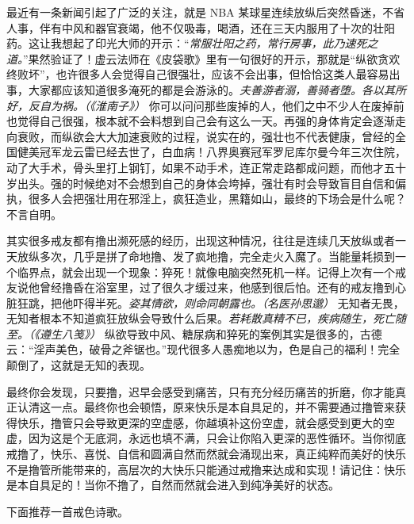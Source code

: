 最近有一条新闻引起了广泛的关注，就是 NBA 某球星连续放纵后突然昏迷，不省人事，伴有中风和器官衰竭，他不仅吸毒，喝酒，还在三天内服用了十次的壮阳药。这让我想起了印光大师的开示：“\textit{常服壮阳之药，常行房事，此乃速死之道。}”果然验证了！虚云法师在《皮袋歌》里有一句很好的开示，那就是“纵欲贪欢终败坏”，也许很多人会觉得自己很强壮，应该不会出事，但恰恰这类人最容易出事，大家都应该知道很多淹死的都是会游泳的。\textit{夫善游者溺，善骑者堕。各以其所好，反自为祸。（《淮南子》）} 你可以问问那些废掉的人，他们之中不少人在废掉前也觉得自己很强，根本就不会料想到自己会有这么一天。再强的身体肯定会逐渐走向衰败，而纵欲会大大加速衰败的过程，说实在的，强壮也不代表健康，曾经的全国健美冠军龙云雷已经去世了，白血病！八界奥赛冠军罗尼库尔曼今年三次住院，动了大手术，骨头里打上钢钉，如果不动手术，连正常走路都成问题，而他才五十岁出头。强的时候绝对不会想到自己的身体会垮掉，强壮有时会导致盲目自信和偏执，很多人会把强壮用在邪淫上，疯狂造业，黑籍如山，最终的下场会是什么呢？不言自明。

其实很多戒友都有撸出濒死感的经历，出现这种情况，往往是连续几天放纵或者一天放纵多次，几乎是拼了命地撸、发了疯地撸，完全走火入魔了。当能量耗损到一个临界点，就会出现一个现象：猝死！就像电脑突然死机一样。记得上次有一个戒友说他曾经撸昏在浴室里，过了很久才缓过来，他感到很后怕。还有的戒友撸到心脏狂跳，把他吓得半死。\textit{姿其情欲，则命同朝露也。（名医孙思邈）} 无知者无畏，无知者根本不知道疯狂放纵会导致什么后果。\textit{若耗散真精不已，疾病随生，死亡随至。（《遵生八笺》）} 纵欲导致中风、糖尿病和猝死的案例其实是很多的，古德云：“淫声美色，破骨之斧锯也。”现代很多人愚痴地以为，色是自己的福利！完全颠倒了，这就是无知的表现。

最终你会发现，只要撸，迟早会感受到痛苦，只有充分经历痛苦的折磨，你才能真正认清这一点。最终你也会顿悟，原来快乐是本自具足的，并不需要通过撸管来获得快乐，撸管只会导致更深的空虚感，你越填补这份空虚，就会感受到更大的空虚，因为这是个无底洞，永远也填不满，只会让你陷入更深的恶性循环。当你彻底戒撸了，快乐、喜悦、自信和圆满自然而然就会涌现出来，真正纯粹而美好的快乐不是撸管所能带来的，高层次的大快乐只能通过戒撸来达成和实现！请记住：快乐是本自具足的！当你不撸了，自然而然就会进入到纯净美好的状态。

下面推荐一首戒色诗歌。

